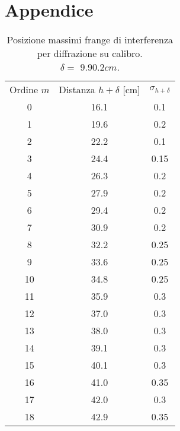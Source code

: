 \appendix
\section{Appendice} \label{sec:Appendice}

\begin{table}[hb]
 \centering
 \begin{tabular}{ccc}
  Ordine $m$ & Distanza $h+\delta$ [cm] & $\sigma_{h+\delta}$ \\
  0 & 16.1 & 0.1 \\
  1 & 19.6 & 0.2 \\
  2 & 22.2 & 0.1 \\
  3 & 24.4 & 0.15 \\
  4 & 26.3 & 0.2 \\
  5 & 27.9 & 0.2 \\
  6 & 29.4 & 0.2 \\
  7 & 30.9 & 0.2 \\
  8 & 32.2 & 0.25 \\
  9 & 33.6 & 0.25 \\
  10 & 34.8 & 0.25 \\
  11 & 35.9 & 0.3 \\
  12 & 37.0 & 0.3 \\
  13 & 38.0 & 0.3 \\
  14 & 39.1 & 0.3 \\
  15 & 40.1 & 0.3 \\
  16 & 41.0 & 0.35 \\
  17 & 42.0 & 0.3 \\
  18 & 42.9 & 0.35 \\
 \end{tabular}
 \caption{Posizione massimi frange di interferenza per diffrazione su calibro.\\
  $\delta =$ ${9.9}{0.2}{cm}$.}
	\label{tab:massimi_interfer}
\end{table}

